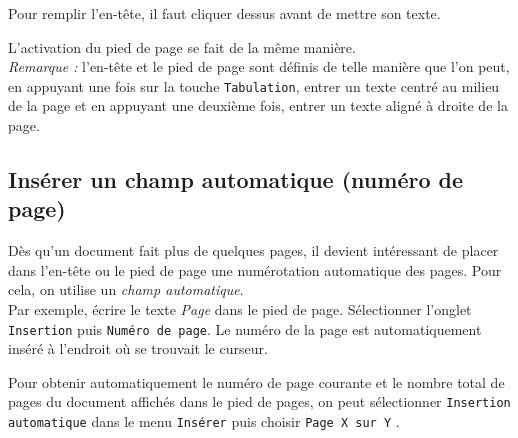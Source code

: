 Pour remplir l'en-tête, il faut cliquer dessus avant de mettre son texte.


L'activation du pied de page se fait de la même manière.\\



\emph{Remarque :} l'en-tête et le pied de page sont définis de telle manière que l'on peut, en appuyant une fois sur la touche \texttt{Tabulation}, entrer un texte centré au milieu de la page et en appuyant une deuxième fois, entrer un texte aligné à droite de la page.



\subsection{Insérer un champ automatique (numéro de page)}\label{Texte3champAuto}

Dès qu'un document fait plus de quelques pages, il devient intéressant de placer dans l'en-tête ou le pied de page une numérotation automatique des pages. Pour cela, on utilise un \emph{champ automatique}. \\

Par exemple, écrire le texte \emph{Page } dans le pied de page. Sélectionner l'onglet \texttt{Insertion} puis \texttt{Numéro de page}. Le numéro de la page est automatiquement inséré à l'endroit où se trouvait le curseur.



Pour obtenir automatiquement le numéro de page courante et le nombre total de pages du document affichés dans le pied de pages, on peut sélectionner \texttt{Insertion automatique}  dans le menu \texttt{Insérer} puis choisir \texttt{Page X sur Y} .



